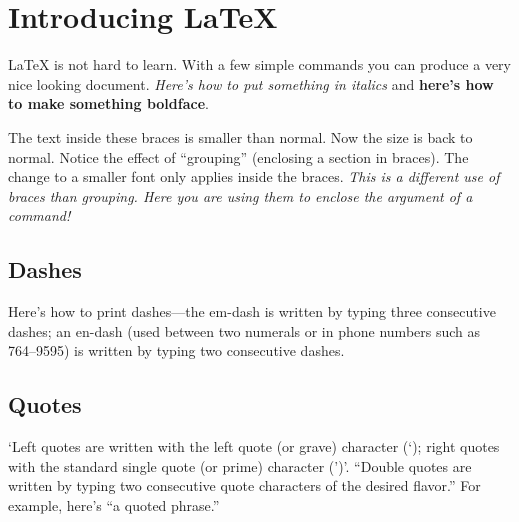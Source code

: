 \documentclass[12pt]{article}                    %
\begin{document}
 
\section*{Introducing LaTeX}                %
LaTeX is not hard to learn.  With a few simple commands you
can produce a very nice looking document.
\textit{Here's how to put something in italics} and 
\textbf{here's how to make something boldface}.

{\small The text inside these braces is smaller than normal.} Now the size
is back to normal.  
Notice the effect of ``grouping'' (enclosing a section in braces). 
The change to a smaller font only applies inside the braces. 
\textit{This is a different use of braces than grouping. Here you are
using them to enclose the argument of a command!}
  
\subsection*{Dashes}                        %
Here's how to print dashes---the em-dash is written by typing three 
consecutive dashes; an en-dash (used between two numerals or in phone
numbers such as 764--9595) is written by typing two consecutive dashes. 

\subsection*{Quotes}                        %
`Left quotes are written with the left quote (or grave) character (`); 
right quotes with the standard single quote (or prime) character (')'. 
``Double quotes are written by typing two consecutive quote characters 
of the desired flavor.'' For example, here's ``a quoted phrase.''
 
\end{document}
